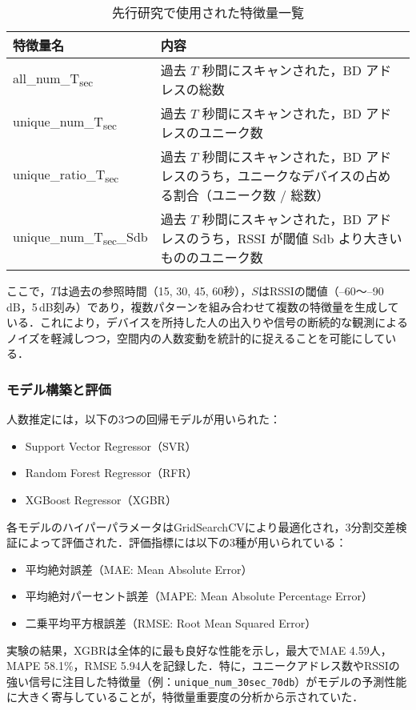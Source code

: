 \begin{table}[tb]
	\centering
	\caption{先行研究で使用された特徴量一覧}
	\label{tbl:blece_features}
	\small
	\doublerulesep=0.3pt
    \begin{tabular}{l|p{5cm}} \hline\hline\hline
		特徴量名 & 内容 \\ \hline
		all\_num\_T\textsubscript{sec} & 過去 $T$ 秒間にスキャンされた，BD アドレスの総数\\ \hline
    unique\_num\_T\textsubscript{sec} & 過去 $T$ 秒間にスキャンされた，BD アドレスのユニーク数 \\ \hline
    unique\_ratio\_T\textsubscript{sec} & 過去 $T$ 秒間にスキャンされた，BD アドレスのうち，ユニークなデバイスの占める割合（ユニーク数 / 総数） \\ \hline
    unique\_num\_T\textsubscript{sec}\_Sdb & 過去 $T$ 秒間にスキャンされた，BD アドレスのうち，RSSI が閾値 Sdb より大きいもののユニーク数 \\ \hline\hline\hline
	\end{tabular}
\end{table}

ここで，$T$は過去の参照時間（15, 30, 45, 60秒），$S$はRSSIの閾値（--60〜--90\,dB，5\,dB刻み）であり，複数パターンを組み合わせて複数の特徴量を生成している．これにより，デバイスを所持した人の出入りや信号の断続的な観測によるノイズを軽減しつつ，空間内の人数変動を統計的に捉えることを可能にしている．

\subsubsection*{モデル構築と評価}

人数推定には，以下の3つの回帰モデルが用いられた：

\begin{itemize}
  \item Support Vector Regressor（SVR）
  \item Random Forest Regressor（RFR）
  \item XGBoost Regressor（XGBR）
\end{itemize}

各モデルのハイパーパラメータはGridSearchCVにより最適化され，3分割交差検証によって評価された．評価指標には以下の3種が用いられている：

\begin{itemize}
  \item 平均絶対誤差（MAE: Mean Absolute Error）
  \item 平均絶対パーセント誤差（MAPE: Mean Absolute Percentage Error）
  \item 二乗平均平方根誤差（RMSE: Root Mean Squared Error）
\end{itemize}

実験の結果，XGBRは全体的に最も良好な性能を示し，最大でMAE 4.59人，MAPE 58.1\%，RMSE 5.94人を記録した．特に，ユニークアドレス数やRSSIの強い信号に注目した特徴量（例：\texttt{unique\_num\_30sec\_70db}）がモデルの予測性能に大きく寄与していることが，特徴量重要度の分析から示されていた．

